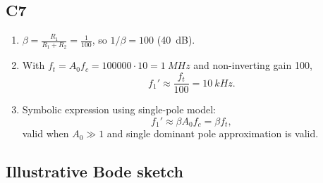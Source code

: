 \documentclass[12pt,a4paper]{article}
\begin{document}
\subsection{C7}
\begin{enumerate}
\item $\beta=\frac{R_1}{R_1+R_2}=\frac{1}{100}$, so $1/\beta=100$ (\SI{40}{dB}).
\item With $f_t=A_0f_c=100000\cdot10=\SI{1}{MHz}$ and non-inverting gain 100, 
\[
f_1'\approx\frac{f_t}{100}=\SI{10}{kHz}.
\]
\item Symbolic expression using single-pole model:
\[
f_1'\approx\beta A_0 f_c = \beta f_t,
\]
valid when $A_0\gg1$ and single dominant pole approximation is valid.
\end{enumerate}

\subsection{Illustrative Bode sketch}
\begin{center}
\end{center}
\end{document}
